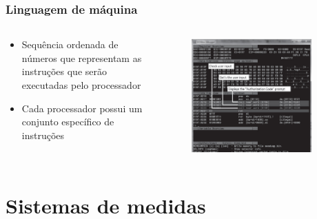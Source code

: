 \documentclass[aspectratio=169,
				xcolor=table]{beamer}
\begin{document}
	\begin{frame}
		\frametitle{Linguagem de máquina}
		\begin{columns}
			\begin{column}{0.55\textwidth}
				\begin{itemize}
					\item Sequência ordenada de números que representam as instruções que serão executadas pelo processador
					\vspace{1em}
					\item Cada processador possui um conjunto específico de instruções
				\end{itemize}
			\end{column}
			\begin{column}{0.45\textwidth}
			\begin{figure}
				\centering
				\includegraphics[width=0.9\textwidth, keepaspectratio]{../figs/cap01/linguagemMaquina.png} 
			\end{figure}
			\end{column}
		\end{columns}
	\end{frame}
	
	\section{Sistemas de medidas}
	
\end{document}
